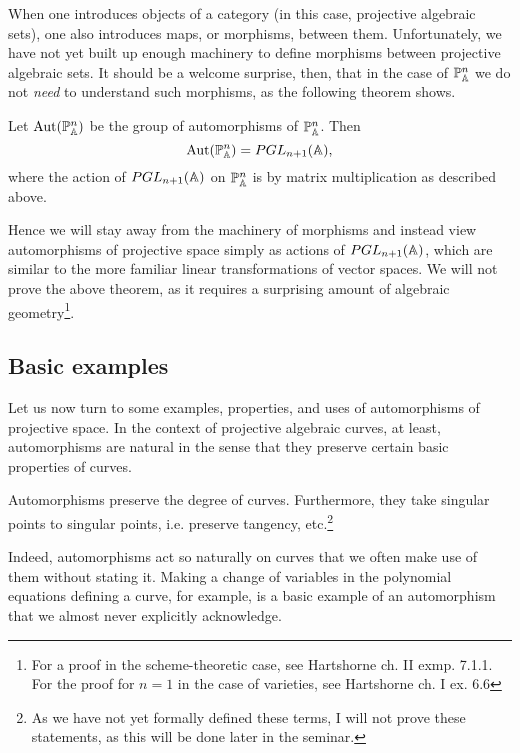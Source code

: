 \documentclass{../../mathnotes}
\begin{document}
When one introduces objects of a category (in this case, projective algebraic sets), one also introduces maps, or morphisms, between
them. Unfortunately, we have not yet built up enough machinery to define morphisms between projective algebraic sets.
It should be a welcome surprise, then, that in the case of $\mathbb{P}^n_{\mathbb{A}}$ we do not \textit{need} to understand such morphisms,
as the following theorem shows.

\begin{thm}
    Let $\operatorname{Aut}(\mathbb{P}^n_{\mathbb{A}})$ be the group of automorphisms of $\mathbb{P}^n_{\mathbb{A}}$. Then
    \[\operatorname{Aut}(\mathbb{P}^n_{\mathbb{A}})=PGL_{n+1}(\mathbb{A}),\]
    where the action of $PGL_{n+1}(\mathbb{A})$ on $\mathbb{P}^n_{\mathbb{A}}$ is by matrix multiplication as described above.
\end{thm}

Hence we will stay away from the machinery of morphisms and instead view automorphisms of projective space simply as actions of $PGL_{n+1}(\mathbb{A})$,
which are similar to the more familiar linear transformations of vector spaces. We will not prove the above theorem, as it requires a surprising
amount of algebraic geometry\footnote{For a proof in the scheme-theoretic case, see Hartshorne ch. II exmp. 7.1.1. For the proof for $n=1$
in the case of varieties, see Hartshorne ch. I ex. 6.6}.

\subsection*{Basic examples}

Let us now turn to some examples, properties, and uses of automorphisms of projective space. In the context
of projective algebraic curves, at least, automorphisms are natural in the sense that they preserve certain basic
properties of curves.

\begin{rem}
    Automorphisms preserve the degree of curves. Furthermore, they take singular points to singular points, i.e.
    preserve tangency, etc.\footnote{As we have not yet formally defined these terms, I will not prove these statements,
    as this will be done later in the seminar.}
\end{rem}

Indeed, automorphisms act so naturally on curves that we often make use of them without stating it. Making a change
of variables in the polynomial equations defining a curve, for example, is a basic example of an automorphism that
we almost never explicitly acknowledge. 
\end{document}
